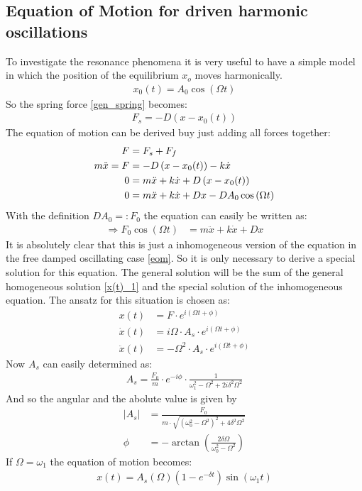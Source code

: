 \subsection{Equation of Motion for driven harmonic oscillations}
To investigate the resonance phenomena it is very useful to have a simple model in which the position of the equilibrium \(x_o\) moves harmonically.
\begin{align}
x_0(t) = A_0\cos \left( \Omega t\right)
\end{align}
So the spring force \eqref{gen_spring} becomes:
\begin{align}
F_s = -D\left(x -x_0(t) \right)
\end{align}
The equation of motion can be derived buy just adding all forces together:
\begin{align}
F &= F_s + F_f \notag\\
m \ddot{x} = F &= -D\left(x -x_0(t) \right) -k \dot{x} \notag \\
0 &= m \ddot{x}  + k \dot{x} + D\left(x -x_0(t) \right) \notag \\
0 &= m \ddot{x}  + k \dot{x} + Dx -DA_0\cos \left( \Omega t\right) \notag
\end{align}
With the definition \(DA_0 =: F_0\) the equation can easily be written as:
\begin{align}
\Rightarrow F_0 \cos \left( \Omega t \right) &= m \ddot{x} + k \dot{x} + Dx
\end{align}
It is absolutely clear that this is just a inhomogeneous version of the equation in the free damped oscillating case \eqref{eom}. So it is only necessary to derive a special solution for this equation. The general solution will be the sum of the general homogeneous solution \eqref{x(t)_1} and the special solution of the inhomogeneous equation.
The ansatz for this situation is chosen as:
\begin{align}
x(t) &= F \cdot e^{i(\Omega t + \phi)} \\
\dot{x}(t) &= i \Omega \cdot A_s \cdot e^{i(\Omega t + \phi)} \\
\ddot{x}(t) &= - \Omega^2 \cdot A_s \cdot e^{i(\Omega t + \phi)}
\end{align}
Now \(A_s\) can easily determined as:
\begin{align}
A_s = \frac{F_0}{m} \cdot e^{-i\phi} \cdot \frac{1}{\omega_1^2-\Omega^2 + 2i\delta^2\Omega^2} 
\end{align}
And so the angular and the abolute value is given by
\begin{align}
\left|A_s\right| &= \frac{F_0}{m \cdot \sqrt{\left(\omega_0^2-\Omega^2\right)^2+4\delta^2\Omega^2}}
\\ \phi &= -\arctan \left( \frac{2\delta \Omega}{\omega_0^2-\Omega^2} \right)
\end{align}
If \(\Omega = \omega_1 \) the equation of motion becomes:
\begin{align}
x(t) = A_s(\Omega)(1-e^{-\delta t})\sin(\omega_1 t)
\end{align} 